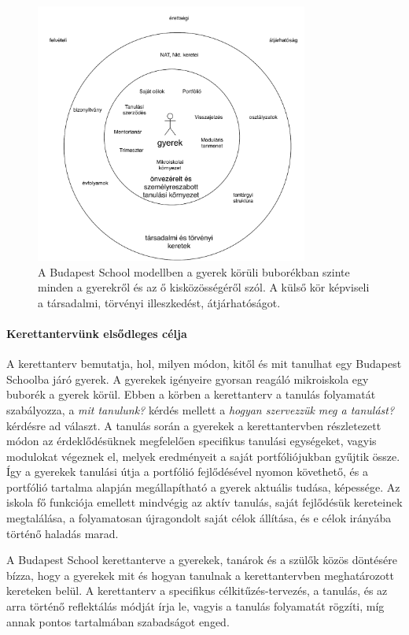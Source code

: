 \begin{figure}
    \centering
    \includegraphics[width=0.8\textwidth]{chapters/kerettanterv/model.pdf}
    \caption{A Budapest School modellben a gyerek körüli buborékban szinte minden a gyerekről és az ő kisközösségéről szól. A külső kör képviseli a társadalmi, törvényi illeszkedést, átjárhatóságot.}
    \label{fig:bps_model}
\end{figure}

\paragraph{Kerettantervünk elsődleges célja} A kerettanterv bemutatja, hol, milyen módon, kitől és mit tanulhat egy Budapest Schoolba járó gyerek.
A gyerekek igényeire gyorsan reagáló mikroiskola egy buborék a gyerek körül. Ebben a körben a kerettanterv a tanulás folyamatát szabályozza, a \emph{mit tanulunk?} kérdés mellett a \emph{hogyan szervezzük meg a tanulást?} kérdésre ad választ. A tanulás során a gyerekek a kerettantervben részletezett módon az érdeklődésüknek megfelelően specifikus tanulási egységeket, vagyis modulokat végeznek el, melyek eredményeit a saját portfóliójukban gyűjtik össze. Így a gyerekek tanulási útja a portfólió fejlődésével nyomon követhető, és a portfólió tartalma alapján megállapítható a gyerek aktuális tudása, képessége. Az iskola fő funkciója emellett mindvégig az aktív tanulás, saját fejlődésük kereteinek megtalálása, a folyamatosan újragondolt saját célok állítása, és e célok irányába történő haladás marad.
 
A Budapest School kerettanterve a gyerekek, tanárok és a szülők közös döntésére bízza, hogy a gyerekek mit és hogyan tanulnak a kerettantervben meghatározott kereteken belül. A kerettanterv a specifikus célkitűzés-tervezés, a tanulás, és az arra történő reflektálás módját írja le, vagyis a tanulás folyamatát rögzíti, míg annak pontos tartalmában szabadságot enged.

